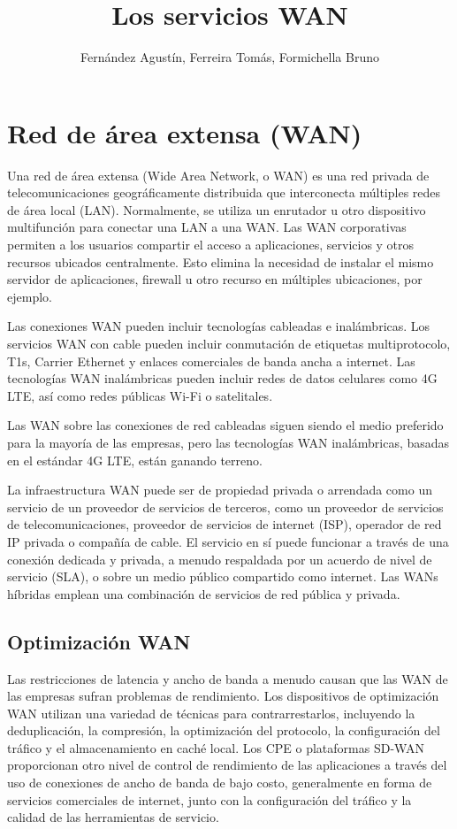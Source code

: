 \documentclass{report}
\title{Los servicios WAN}
\author{Fernández Agustín, Ferreira Tomás, Formichella Bruno}
\date{}
\begin{document}
\maketitle

\section*{Red de área extensa (WAN)}
Una red de área extensa (Wide Area Network, o WAN) es una red privada de telecomunicaciones geográficamente distribuida que interconecta múltiples redes de área local (LAN). Normalmente, se utiliza un enrutador u otro dispositivo multifunción para conectar una LAN a una WAN. Las WAN corporativas permiten a los usuarios compartir el acceso a aplicaciones, servicios y otros recursos ubicados centralmente. Esto elimina la necesidad de instalar el mismo servidor de aplicaciones, firewall u otro recurso en múltiples ubicaciones, por ejemplo.\par
Las conexiones WAN pueden incluir tecnologías cableadas e inalámbricas. Los servicios WAN con cable pueden incluir conmutación de etiquetas multiprotocolo, T1s, Carrier Ethernet y enlaces comerciales de banda ancha a internet. Las tecnologías WAN inalámbricas pueden incluir redes de datos celulares como 4G LTE, así como redes públicas Wi-Fi o satelitales.\par
Las WAN sobre las conexiones de red cableadas siguen siendo el medio preferido para la mayoría de las empresas, pero las tecnologías WAN inalámbricas, basadas en el estándar 4G LTE, están ganando terreno.\par
La infraestructura WAN puede ser de propiedad privada o arrendada como un servicio de un proveedor de servicios de terceros, como un proveedor de servicios de telecomunicaciones, proveedor de servicios de internet (ISP), operador de red IP privada o compañía de cable. El servicio en sí puede funcionar a través de una conexión dedicada y privada, a menudo respaldada por un acuerdo de nivel de servicio (SLA), o sobre un medio público compartido como internet. Las WANs híbridas emplean una combinación de servicios de red pública y privada.\par

\subsection*{Optimización WAN}
Las restricciones de latencia y ancho de banda a menudo causan que las WAN de las empresas sufran problemas de rendimiento. Los dispositivos de optimización WAN utilizan una variedad de técnicas para contrarrestarlos, incluyendo la deduplicación, la compresión, la optimización del protocolo, la configuración del tráfico y el almacenamiento en caché local. Los CPE o plataformas SD-WAN proporcionan otro nivel de control de rendimiento de las aplicaciones a través del uso de conexiones de ancho de banda de bajo costo, generalmente en forma de servicios comerciales de internet, junto con la configuración del tráfico y la calidad de las herramientas de servicio.\par
\end{document}
